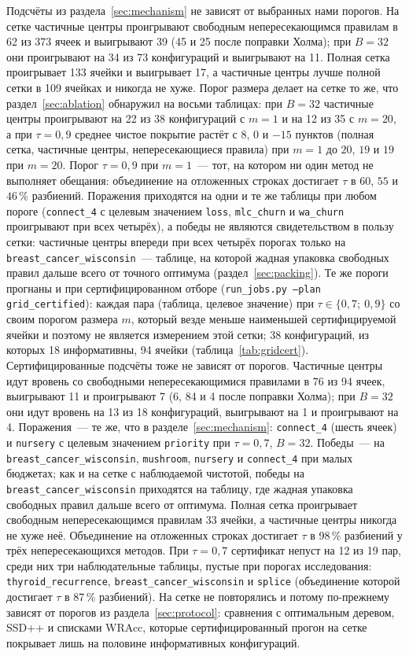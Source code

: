 \documentclass[11pt]{article}
\begin{document}
Подсчёты из раздела~\ref{sec:mechanism} не зависят от выбранных нами порогов. На сетке частичные центры проигрывают свободным непересекающимся правилам в 62 из 373 ячеек и выигрывают 39 (45 и 25 после поправки Холма); при $B=32$ они проигрывают на 34 из 73 конфигураций и выигрывают на 11. Полная сетка проигрывает 133 ячейки и выигрывает 17, а частичные центры лучше полной сетки в 109 ячейках и никогда не хуже. Порог размера делает на сетке то же, что раздел~\ref{sec:ablation} обнаружил на восьми таблицах: при $B=32$ частичные центры проигрывают на 22 из 38 конфигураций с $m=1$ и на 12 из 35 с $m=20$, а при $\tau=0{,}9$ среднее чистое покрытие растёт с $8$, $0$ и $-15$ пунктов (полная сетка, частичные центры, непересекающиеся правила) при $m=1$ до $20$, $19$ и $19$ при $m=20$. Порог $\tau=0{,}9$ при $m=1$~--- тот, на котором ни один метод не выполняет обещания: объединение на отложенных строках достигает $\tau$ в $60$, $55$ и $46\,\%$ разбиений. Поражения приходятся на одни и те же таблицы при любом пороге (\texttt{connect\_4} с целевым значением \texttt{loss}, \texttt{mlc\_churn} и \texttt{wa\_churn} проигрывают при всех четырёх), а победы не являются свидетельством в пользу сетки: частичные центры впереди при всех четырёх порогах только на \texttt{breast\_cancer\_wisconsin}~--- таблице, на которой жадная упаковка свободных правил дальше всего от точного оптимума (раздел~\ref{sec:packing}). Те же пороги прогнаны и при сертифицированном отборе (\texttt{run\_jobs.py --plan grid\_certified}): каждая пара (таблица, целевое значение) при $\tau\in\{0{,}7;\ 0{,}9\}$ со своим порогом размера $m$, который везде меньше наименьшей сертифицируемой ячейки и поэтому не является измерением этой сетки; 38 конфигураций, из которых 18 информативны, 94 ячейки (таблица~\ref{tab:gridcert}). Сертифицированные подсчёты тоже не зависят от порогов. Частичные центры идут вровень со свободными непересекающимися правилами в 76 из 94 ячеек, выигрывают 11 и проигрывают 7 (6, 84 и 4 после поправки Холма); при $B=32$ они идут вровень на 13 из 18 конфигураций, выигрывают на 1 и проигрывают на 4. Поражения~--- те же, что в разделе~\ref{sec:mechanism}: \texttt{connect\_4} (шесть ячеек) и \texttt{nursery} с целевым значением \texttt{priority} при $\tau=0{,}7$, $B=32$. Победы~--- на \texttt{breast\_cancer\_wisconsin}, \texttt{mushroom}, \texttt{nursery} и \texttt{connect\_4} при малых бюджетах; как и на сетке с наблюдаемой чистотой, победы на \texttt{breast\_cancer\_wisconsin} приходятся на таблицу, где жадная упаковка свободных правил дальше всего от оптимума. Полная сетка проигрывает свободным непересекающимся правилам 33 ячейки, а частичные центры никогда не хуже неё. Объединение на отложенных строках достигает $\tau$ в 98\,\% разбиений у трёх непересекающихся методов. При $\tau=0{,}7$ сертификат непуст на 12 из 19 пар, среди них три наблюдательные таблицы, пустые при порогах исследования: \texttt{thyroid\_recurrence}, \texttt{breast\_cancer\_wisconsin} и \texttt{splice} (объединение которой достигает $\tau$ в 87\,\% разбиений). На сетке не повторялись и потому по-прежнему зависят от порогов из раздела~\ref{sec:protocol}: сравнения с оптимальным деревом, SSD++ и списками WRAcc, которые сертифицированный прогон на сетке покрывает лишь на половине информативных конфигураций.
\end{document}
